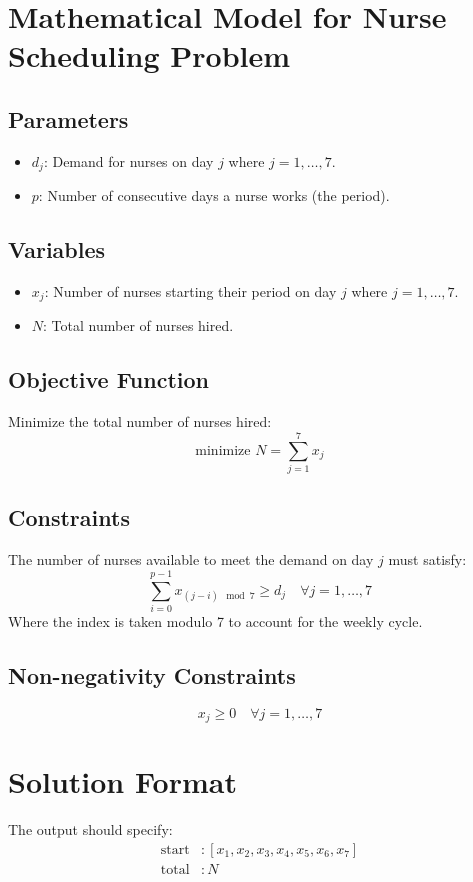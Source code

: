 \documentclass{article}
\begin{document}
\section*{Mathematical Model for Nurse Scheduling Problem}

\subsection*{Parameters}
\begin{itemize}
    \item $d_j$: Demand for nurses on day $j$ where $j = 1, \ldots, 7$.
    \item $p$: Number of consecutive days a nurse works (the period).
\end{itemize}

\subsection*{Variables}
\begin{itemize}
    \item $x_j$: Number of nurses starting their period on day $j$ where $j = 1, \ldots, 7$.
    \item $N$: Total number of nurses hired.
\end{itemize}

\subsection*{Objective Function}
Minimize the total number of nurses hired:
\[
\text{minimize } N = \sum_{j=1}^{7} x_j
\]

\subsection*{Constraints}
The number of nurses available to meet the demand on day $j$ must satisfy:
\[
\sum_{i=0}^{p-1} x_{(j-i) \mod 7} \geq d_j \quad \forall j = 1, \ldots, 7
\]
Where the index is taken modulo 7 to account for the weekly cycle.

\subsection*{Non-negativity Constraints}
\[
x_j \geq 0 \quad \forall j = 1, \ldots, 7
\]

\section*{Solution Format}
The output should specify:
\[
\begin{align*}
\text{start} &: [x_1, x_2, x_3, x_4, x_5, x_6, x_7] \\
\text{total} &: N
\end{align*}
\]
\end{document}
